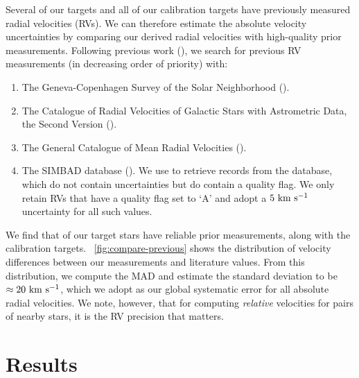\documentclass[modern, letterpaper]{aastex61}
\begin{document}
Several of our targets and all of our calibration targets have previously
measured radial velocities (RVs).
We can therefore estimate the absolute velocity uncertainties by comparing our
derived radial velocities with high-quality prior measurements.
Following previous work (\citealt{Shaya:2011}), we search for previous RV
measurements (in decreasing order of priority) with:
\begin{enumerate}
  \item The Geneva-Copenhagen Survey of the Solar Neighborhood
  (\citealt{Nordstrom:2004}).
  \item The Catalogue of Radial Velocities of Galactic Stars with Astrometric
  Data, the Second Version (\citealt{Kharchenko:2007}).
  \item The General Catalogue of Mean Radial Velocities
  (\citealt{Barbier-Brossat:2000}).
  \item The SIMBAD database (\citealt{Wenger:2000}). We use 
  to retrieve records from the database, which do not contain uncertainties but
  do contain a quality flag. We only retain RVs that have a quality flag set to
  `A' and adopt a $5~\mathrm{km}~\mathrm{s}^{-1}$ uncertainty for all such values.
\end{enumerate}
We find that  of our target stars have reliable prior measurements,
along with the  calibration targets.
\figurename~\ref{fig:compare-previous} shows the distribution of velocity
differences between our measurements and literature values.
From this distribution, we compute the MAD and estimate the standard deviation
to be $\approx 20~\mathrm{km}~\mathrm{s}^{-1}$, which we adopt as our global systematic error for all
absolute radial velocities.
We note, however, that for computing \emph{relative} velocities for pairs of
nearby stars, it is the RV precision that matters.


\section{Results} \label{sec:results}

\end{document}
